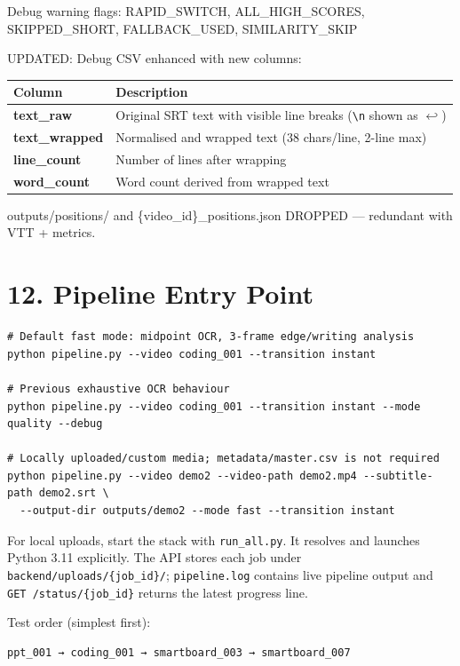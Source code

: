 \documentclass[11pt]{article}
\begin{document}
Debug warning flags: RAPID\_SWITCH, ALL\_HIGH\_SCORES, SKIPPED\_SHORT, FALLBACK\_USED, SIMILARITY\_SKIP

UPDATED: Debug CSV enhanced with new columns:

\begin{tabularx}{\textwidth}{>{\bfseries}l X}
Column & Description \\
\midrule
text\_raw & Original SRT text with visible line breaks (\texttt{\textbackslash n} shown as $\hookleftarrow$) \\
text\_wrapped & Normalised and wrapped text (38 chars/line, 2-line max) \\
line\_count & Number of lines after wrapping \\
word\_count & Word count derived from wrapped text \\
\end{tabularx}

\noindent outputs/positions/ and \{video\_id\}\_positions.json DROPPED --- redundant with VTT + metrics.


\section*{12. Pipeline Entry Point}
\begin{verbatim}
# Default fast mode: midpoint OCR, 3-frame edge/writing analysis
python pipeline.py --video coding_001 --transition instant

# Previous exhaustive OCR behaviour
python pipeline.py --video coding_001 --transition instant --mode quality --debug

# Locally uploaded/custom media; metadata/master.csv is not required
python pipeline.py --video demo2 --video-path demo2.mp4 --subtitle-path demo2.srt \
  --output-dir outputs/demo2 --mode fast --transition instant
\end{verbatim}

For local uploads, start the stack with \texttt{run\_all.py}. It resolves and launches Python 3.11 explicitly. The API stores each job under \texttt{backend/uploads/\{job\_id\}/}; \texttt{pipeline.log} contains live pipeline output and \texttt{GET /status/\{job\_id\}} returns the latest progress line.

Test order (simplest first):
\begin{verbatim}
ppt_001 → coding_001 → smartboard_003 → smartboard_007
\end{verbatim}
\end{document}
